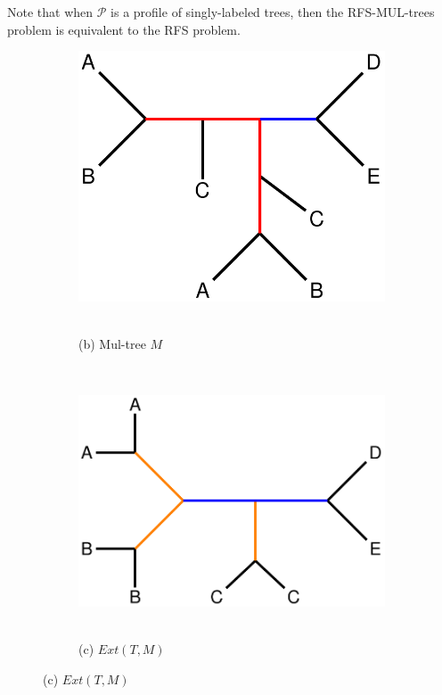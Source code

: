 Note that when $\mathcal{P}$ is a profile of singly-labeled trees, then the RFS-MUL-trees problem is equivalent to the \gls{RFS} problem.

\vspace{12pt}

\begin{figure}[!h]
	\centering
	\begin{subfigure}[t]{0.36\textwidth}
	\centering
		\includegraphics[width=\textwidth]{figures/fastmulrfs-fig1b.pdf}
		~
		\caption{(b) Mul-tree $M$}
	\end{subfigure}
	~~~~~~~~~~~~~~~
	\begin{subfigure}[t]{0.432\textwidth}
		\centering
		\includegraphics[width=\textwidth]{figures/fastmulrfs-fig1c.pdf}
		~
		\caption{(c) $Ext(T,M)$}
	\end{subfigure}
	

\end{figure}
